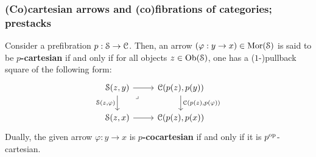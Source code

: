         \subsubsection{(Co)cartesian arrows and (co)fibrations of categories; prestacks}
            \begin{definition} \label{def: (co)cartesian_arrows}
                Consider a prefibration $p: \mathcal{S} \to \mathcal{C}$. Then, an arrow $(\varphi: y \to x) \in \mathrm{Mor}(\mathcal{S})$ is said to be \textbf{$p$-cartesian} if and only if for all objects $z \in \mathrm{Ob}(\mathcal{S})$, one has a ($1$-)pullback square of the following form:
                    $$
                        \begin{tikzcd}
                        	{\S(z, y)} & {\C(p(z), p(y))} \\
                        	{\S(z, x)} & {\C(p(z), p(x))}
                        	\arrow["{\S(z, \varphi)}"', from=1-1, to=2-1]
                        	\arrow[from=2-1, to=2-2]
                        	\arrow["{\C(p(z), p(\varphi))}", from=1-2, to=2-2]
                        	\arrow[from=1-1, to=1-2]
                        	\arrow["\lrcorner"{anchor=center, pos=0.125}, draw=none, from=1-1, to=2-2]
                        \end{tikzcd}
                    $$
                Dually, the given arrow $\varphi: y \to x$ is \textbf{$p$-cocartesian} if and only if it is $p^{\mathrm{op}}$-cartesian.
            \end{definition}
            \begin{remark} \label{remark: weak_(co)cartesian_arrows}
                
            \end{remark}
